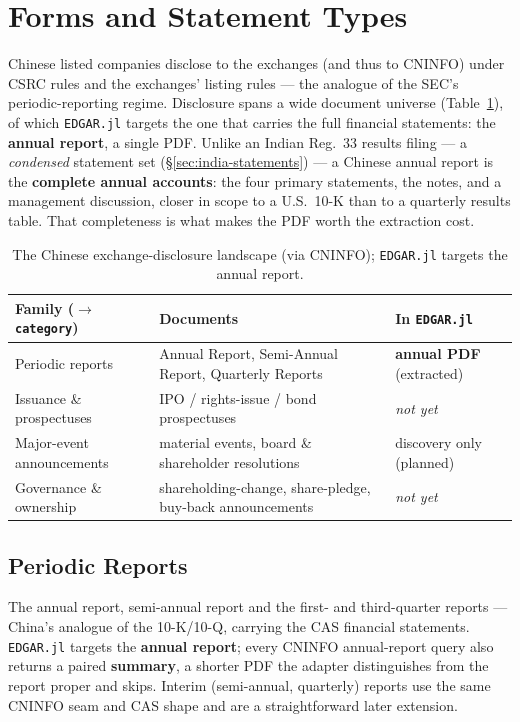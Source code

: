 \documentclass[11pt,a4paper]{report}
\begin{document}
\section{Forms and Statement Types}\label{sec:china-forms}

Chinese listed companies disclose to the exchanges (and thus to CNINFO) under CSRC rules and the exchanges'
listing rules --- the analogue of the SEC's periodic-reporting regime. Disclosure spans a wide document
universe (Table~\ref{tab:china-forms}), of which \texttt{EDGAR.jl} targets the one that carries the full
financial statements: the \textbf{annual report}, a single PDF. Unlike an Indian
Reg.~33 results filing --- a \emph{condensed} statement set (\S\ref{sec:india-statements}) --- a Chinese
annual report is the \textbf{complete annual accounts}: the four primary statements, the notes, and a
management discussion, closer in scope to a U.S.\ 10-K than to a quarterly
results table. That completeness is what makes the PDF worth the extraction cost.

\begin{table}[h]
\centering
\small
\caption{The Chinese exchange-disclosure landscape (via CNINFO); \texttt{EDGAR.jl} targets the annual report.}
\label{tab:china-forms}
\begin{tabular}{@{}p{}p{}p{}@{}}
\toprule
\textbf{Family ($\to$ \texttt{category})} & \textbf{Documents} & \textbf{In \texttt{EDGAR.jl}} \\
\midrule
Periodic reports & Annual Report, Semi-Annual Report, Quarterly Reports & \textbf{annual PDF} (extracted) \\
Issuance \& prospectuses & IPO / rights-issue / bond prospectuses & \emph{not yet} \\
Major-event announcements & material events, board \& shareholder resolutions & discovery only (planned) \\
Governance \& ownership & shareholding-change, share-pledge, buy-back announcements & \emph{not yet} \\
\bottomrule
\end{tabular}
\end{table}

\subsection{Periodic Reports}
The annual report, semi-annual report and the first- and
third-quarter reports --- China's analogue of the 10-K/10-Q, carrying the CAS financial
statements. \texttt{EDGAR.jl} targets the \textbf{annual report}; every CNINFO annual-report query also
returns a paired \textbf{summary}, a shorter PDF the adapter distinguishes from the report
proper and skips. Interim (semi-annual, quarterly) reports use the same CNINFO seam and CAS shape and are a
straightforward later extension.
\end{document}
